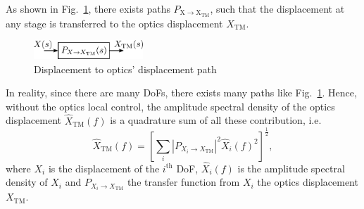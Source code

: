 As shown in Fig.~\ref{fig:displacementtooptics}, there exists paths $P_\mathrm{X\to X_\mathrm{TM}}$, such that the displacement at any stage is transferred to the optics displacement $X_\mathrm{TM}$.
\begin{figure}[!h]
	\centering
	\includegraphics[width=41mm]{figures/displacement_to_optics}
	\caption{Displacement to optics' displacement path}
	\label{fig:displacementtooptics}
\end{figure}
In reality, since there are many DoFs, there exists many paths like Fig.~\ref{fig:displacementtooptics}.
Hence, without the optics local control, the amplitude spectral density of the optics displacement $\hat{X}_\mathrm{TM}(f)$ is a quadrature sum of all these contribution, i.e.
\begin{equation}
	\hat{X}_\mathrm{TM}(f)=\left[\sum_i\left\lvert P_{X_i\to X_\mathrm{TM}}\right\rvert^2 \hat{X}_i(f)^2\right]^{\frac{1}{2}},
	\label{eqn:x_tm_asd}
\end{equation}
where $X_i$ is the displacement of the $i^\mathrm{th}$ DoF, $\hat{X}_i(f)$ is the amplitude spectral density of $X_i$ and $P_{X_i\to X_\mathrm{TM}}$ the transfer function from $X_i$ the optics displacement $X_\mathrm{TM}$.

